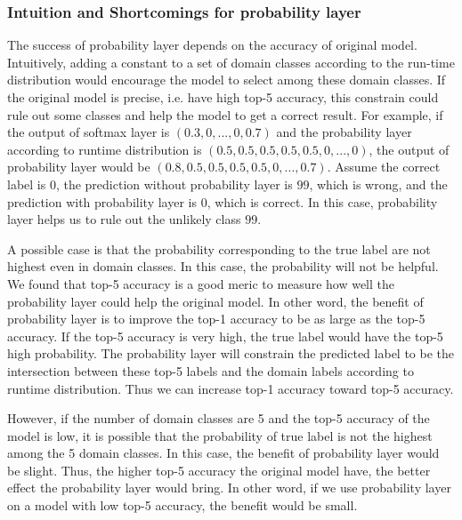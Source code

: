 \documentclass{article}
\begin{document}
\subsubsection{Intuition and Shortcomings for probability layer}
The success of probability layer depends on the accuracy of original model. Intuitively, adding a constant to a set of domain classes according to the run-time distribution would encourage the model to select among these domain classes. If the original model is precise, i.e. have high top-5 accuracy, this constrain could rule out some classes and help the model to get a correct result. For example, if the output of softmax layer is $(0.3, 0, ..., 0, 0.7)$ and the probability layer according to runtime distribution is $(0.5, 0.5, 0.5, 0.5, 0.5, 0, ..., 0)$, the output of probability layer would be $(0.8, 0.5, 0.5, 0.5, 0.5, 0, ..., 0.7)$. Assume the correct label is $0$,  the prediction without probability layer is $99$, which is wrong, and the prediction with probability layer is $0$, which is correct. In this case, probability layer helps us to rule out the unlikely class $99$.

A possible case is that the probability corresponding to the true label are not highest even in domain classes. In this case, the probability will not be helpful. We found that top-5 accuracy is a good meric to measure how well the probability layer could help the original model. In other word, the benefit of probability layer is to improve the top-1 accuracy to be as large as the top-5 accuracy. If the top-5 accuracy is very high, the true label would have the top-5 high probability. The probability layer will constrain the predicted label to be the intersection between these top-5 labels and the domain labels according to runtime distribution. Thus we can increase top-1 accuracy toward top-5 accuracy. 

However, if the number of domain classes are 5 and the top-5 accuracy of the model is low, it is possible that the probability of true label is not the highest among the 5 domain classes. In this case, the benefit of probability layer would be slight. Thus, the higher top-5 accuracy the original model have, the better effect the probability layer would bring. In other word, if we use probability layer on a model with low top-5 accuracy, the benefit would be small. 

\end{document}
